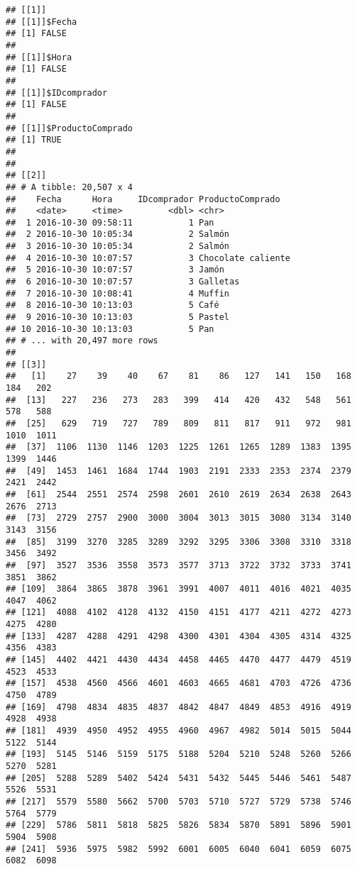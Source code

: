 \documentclass[
]{book}
\begin{document}
\begin{verbatim}
## [[1]]
## [[1]]$Fecha
## [1] FALSE
## 
## [[1]]$Hora
## [1] FALSE
## 
## [[1]]$IDcomprador
## [1] FALSE
## 
## [[1]]$ProductoComprado
## [1] TRUE
## 
## 
## [[2]]
## # A tibble: 20,507 x 4
##    Fecha      Hora     IDcomprador ProductoComprado  
##    <date>     <time>         <dbl> <chr>             
##  1 2016-10-30 09:58:11           1 Pan               
##  2 2016-10-30 10:05:34           2 Salmón            
##  3 2016-10-30 10:05:34           2 Salmón            
##  4 2016-10-30 10:07:57           3 Chocolate caliente
##  5 2016-10-30 10:07:57           3 Jamón             
##  6 2016-10-30 10:07:57           3 Galletas          
##  7 2016-10-30 10:08:41           4 Muffin            
##  8 2016-10-30 10:13:03           5 Café              
##  9 2016-10-30 10:13:03           5 Pastel            
## 10 2016-10-30 10:13:03           5 Pan               
## # ... with 20,497 more rows
## 
## [[3]]
##   [1]    27    39    40    67    81    86   127   141   150   168   184   202
##  [13]   227   236   273   283   399   414   420   432   548   561   578   588
##  [25]   629   719   727   789   809   811   817   911   972   981  1010  1011
##  [37]  1106  1130  1146  1203  1225  1261  1265  1289  1383  1395  1399  1446
##  [49]  1453  1461  1684  1744  1903  2191  2333  2353  2374  2379  2421  2442
##  [61]  2544  2551  2574  2598  2601  2610  2619  2634  2638  2643  2676  2713
##  [73]  2729  2757  2900  3000  3004  3013  3015  3080  3134  3140  3143  3156
##  [85]  3199  3270  3285  3289  3292  3295  3306  3308  3310  3318  3456  3492
##  [97]  3527  3536  3558  3573  3577  3713  3722  3732  3733  3741  3851  3862
## [109]  3864  3865  3878  3961  3991  4007  4011  4016  4021  4035  4047  4062
## [121]  4088  4102  4128  4132  4150  4151  4177  4211  4272  4273  4275  4280
## [133]  4287  4288  4291  4298  4300  4301  4304  4305  4314  4325  4356  4383
## [145]  4402  4421  4430  4434  4458  4465  4470  4477  4479  4519  4523  4533
## [157]  4538  4560  4566  4601  4603  4665  4681  4703  4726  4736  4750  4789
## [169]  4798  4834  4835  4837  4842  4847  4849  4853  4916  4919  4928  4938
## [181]  4939  4950  4952  4955  4960  4967  4982  5014  5015  5044  5122  5144
## [193]  5145  5146  5159  5175  5188  5204  5210  5248  5260  5266  5270  5281
## [205]  5288  5289  5402  5424  5431  5432  5445  5446  5461  5487  5526  5531
## [217]  5579  5580  5662  5700  5703  5710  5727  5729  5738  5746  5764  5779
## [229]  5786  5811  5818  5825  5826  5834  5870  5891  5896  5901  5904  5908
## [241]  5936  5975  5982  5992  6001  6005  6040  6041  6059  6075  6082  6098

\end{verbatim}
\end{document}

